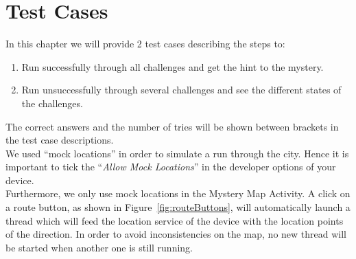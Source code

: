 \chapter{Test Cases}

In this chapter we will provide 2 test cases describing the steps to:
\begin{enumerate}
	\item Run successfully through all challenges and get the hint to the mystery.
	\item Run unsuccessfully through several challenges and see the different states of the challenges.
\end{enumerate}
The correct answers and the number of tries will be shown between brackets in the test case descriptions.
\noindent
\\
\newline
We used ``mock locations'' in order to simulate a run through the city. Hence it is important to tick the ``\emph{Allow Mock Locations}'' in the developer options of your device.
\\
\newline
Furthermore, we only use mock locations in the Mystery Map Activity. A click on a route button, as shown in Figure~\ref{fig:routeButtons}, will automatically launch a thread which will feed the location service of the device with the location points of the direction. In order to avoid inconsistencies on the map, no new thread will be started when another one is still running.

